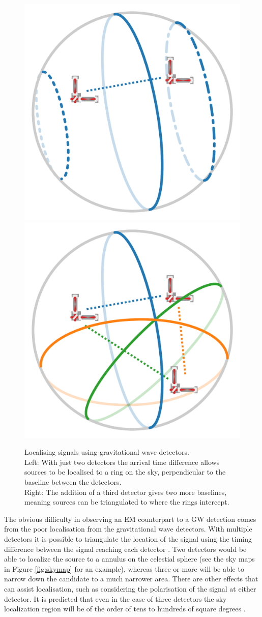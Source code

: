 \begin{colsection}
\begin{colsection}
\begin{figure}[t]
    \begin{center}
        \includegraphics[width=0.45\linewidth]{images/triangulate_1.pdf}
        \includegraphics[width=0.45\linewidth]{images/triangulate_2.pdf}
    \end{center}
    \caption[Localising signals using gravitational wave detectors]{
        Localising signals using gravitational wave detectors. \\
        Left: With just two detectors the arrival time difference allows sources to be localised to a ring on the sky, perpendicular to the baseline between the detectors. \\
        Right: The addition of a third detector gives two more baselines, meaning sources can be triangulated to where the rings intercept.
        }\label{fig:triangulate}
\end{figure}



\todo{}

The obvious difficulty in observing an EM counterpart to a GW detection comes from the poor localisation from the gravitational wave detectors. With multiple detectors it is possible to triangulate the location of the signal using the timing difference between the signal reaching each detector \citep{LIGO-localization,LIGO-localization2}. Two detectors would be able to localize the source to a annulus on the celestial sphere (see the sky maps in Figure \ref{fig:skymap} for an example), whereas three or more will be able to narrow down the candidate to a much narrower area. There are other effects that can assist localisation, such as considering the polarisation of the signal at either detector. It is predicted that even in the case of three detectors the sky localization region will be of the order of tens to hundreds of square degrees \citep{LIGO-prospects}.


\end{colsection}
\end{colsection}
